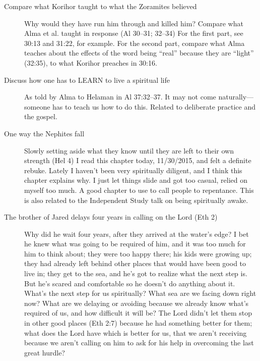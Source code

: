 \begin{description}
		\item[Compare what Korihor taught to what the Zoramites believed]
			Why would they have run him through and killed him? Compare what Alma et al. taught in response (Al 30--31; 32--34)	For the first part, see 30:13 and 31:22, for example. For the second part, compare what Alma teaches about the effects of the word being ``real'' because they are ``light'' (32:35), to what Korihor preaches in 30:16.
			
		\item[Discuss how one has to LEARN to live a spiritual life]
			As told by Alma to Helaman in Al 37:32--37. It may not come naturally---someone has to teach us how to do this. Related to deliberate practice and the gospel.
			
		\item[One way the Nephites fall]
			Slowly setting aside what they know until they are left to their own strength (Hel 4) I read this chapter today, 11/30/2015, and felt a definite rebuke. Lately I haven't been very spiritually diligent, and I think this chapter explains why. I just let things slide and got too casual, relied on myself too much. A good chapter to use to call people to repentance.
			This is also related to the Independent Study talk on being spiritually awake.
			
		\item[The brother of Jared delays four years in calling on the Lord (Eth 2)]
			Why did he wait four years, after they arrived at the water's edge? I bet he knew what was going to be required of him, and it was too much for him to think about; they were too happy there; his kids were growing up; they had already left behind other places that would have been good to live in; they get to the sea, and he's got to realize what the next step is. But he's scared and comfortable so he doesn't do anything about it.
			What's the next step for us spiritually? What sea are we facing down right now? What are we delaying or avoiding because we already know what's required of us, and how difficult it will be? The Lord didn't let them stop in other good places (Eth 2:7) because he had something better for them; what does the Lord have which is better for us, that we aren't receiving because we aren't calling on him to ask for his help in overcoming the last great hurdle?
			

\end{description}
